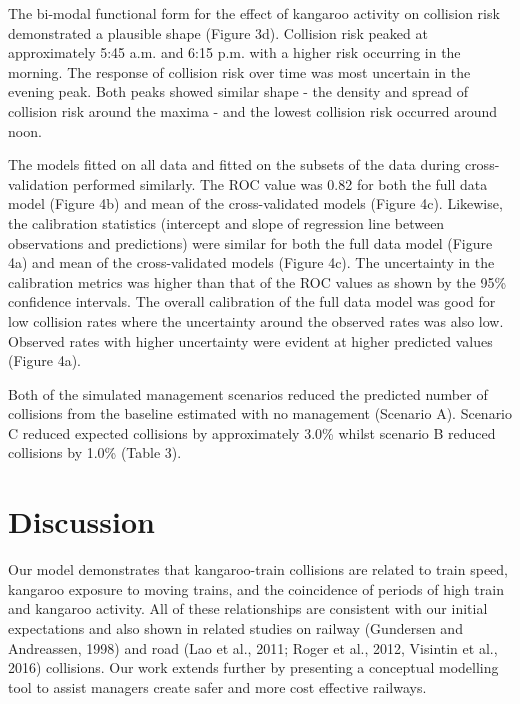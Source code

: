The bi-modal functional form for the effect of kangaroo activity on collision risk demonstrated a plausible shape (Figure 3d).  Collision risk peaked at approximately 5:45 a.m. and 6:15 p.m. with a higher risk occurring in the morning.  The response of collision risk over time was most uncertain in the evening peak.  Both peaks showed similar shape - the density and spread of collision risk around the maxima - and the lowest collision risk occurred around noon.

The models fitted on all data and fitted on the subsets of the data during cross-validation performed similarly.  The ROC value was 0.82 for both the full data model (Figure 4b) and mean of the cross-validated models (Figure 4c).  Likewise, the calibration statistics (intercept and slope of regression line between observations and predictions) were similar for both the full data model (Figure 4a) and mean of the cross-validated models (Figure 4c).  The uncertainty in the calibration metrics was higher than that of the ROC values as shown by the 95\% confidence intervals.  The overall calibration of the full data model was good for low collision rates where the uncertainty around the observed rates was also low. Observed rates with higher uncertainty were evident at higher predicted values (Figure 4a).

Both of the simulated management scenarios reduced the predicted number of collisions from the baseline estimated with no management (Scenario A).  Scenario C reduced expected collisions by approximately 3.0\% whilst scenario B reduced collisions by 1.0\% (Table 3).

\section{Discussion}

Our model demonstrates that kangaroo-train collisions are related to train speed, kangaroo exposure to moving trains, and the coincidence of periods of high train and kangaroo activity.  All of these relationships are consistent with our initial expectations and also shown in related studies on railway (Gundersen and Andreassen, 1998) and road (Lao et al., 2011; Roger et al., 2012, Visintin et al., 2016) collisions. Our work extends further by presenting a conceptual modelling tool to assist managers create safer and more cost effective railways.

